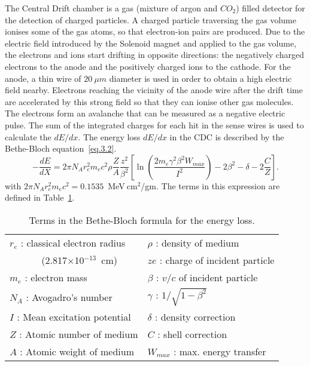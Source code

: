 The Central Drift chamber is a gas (mixture of argon and $CO_{2}$) filled detector for the detection of charged particles. A charged particle traversing the gas volume ionises some of the gas atoms, so that electron-ion pairs are produced. Due to the electric field introduced by the Solenoid magnet and applied to the gas volume, the electrons and ions start drifting in opposite directions: the negatively charged electrons to the anode and the positively charged ions to the cathode. For the anode, a thin wire of $20~\mu m$ diameter is used in order to obtain a high electric field nearby. Electrons reaching the vicinity of the anode wire after the drift time are accelerated by this strong field so that they can ionise other gas molecules. The electrons form an avalanche that can be measured as a negative electric pulse. The sum of the integrated charges for each hit in the sense wires is used to calculate the $dE/dx$.
The energy loss $dE/dx$ in the CDC is described by the Bethe-Bloch equation~\ref{eq.3.2}.
\begin{equation}
    \label{eq.3.2}
    -\frac{dE}{dX} = 2 \pi N_A r_e^2 m_e c^2 \rho \frac{Z}{A} \frac{z^2}{\beta^2} \left [ \ln \left( \frac{2 m_e \gamma^2 \beta^2 W_{max}}{I^2} \right) - 2 \beta^2 - \delta - 2\frac{C}{Z} \right].
\end{equation}
with $2 \pi N_A r_e^2 m_e c^2 = 0.1535$~MeV$~\!$cm$^2$/gm. The terms in this expression are defined in Table~\ref{tab.3.1}.
\begin{table}[htbp]
    \begin{center}
        \begin{tabular} {||l||l||} \hline
            $r_e$ : classical electron radius   & $\rho$ : density of medium \\
            ~~~~~~ (2.817$\times$10$^{-13}$~cm) & $ze$ : charge of incident particle \\
            $m_e$ : electron mass               & $\beta$ : $v/c$ of incident particle \\
            $N_A$ : Avogadro's number           & $\gamma$ : $1/\sqrt{1 - \beta^2}$ \\
            $I$  : Mean excitation potential    & $\delta$ : density correction \\
            $Z$ : Atomic number of medium       & $C$ : shell correction \\
            $A$ : Atomic weight of medium       & $W_{max}$ : max. energy transfer \\ \hline
        \end{tabular}
    \end{center}
    \caption{\small{Terms in the Bethe-Bloch formula for the energy loss.}}
    \label{tab.3.1}
\end{table}
